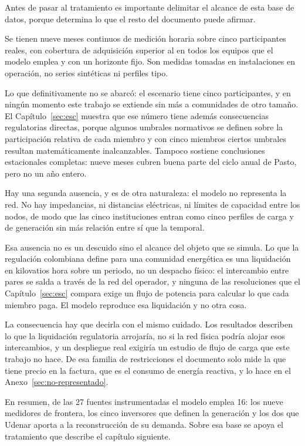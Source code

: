 Antes de pasar al tratamiento es importante delimitar el alcance de esta base de
datos, porque determina lo que el resto del documento puede afirmar.

Se tienen nueve meses continuos de medición horaria sobre cinco
participantes reales, con cobertura de adquisición superior al  en
todos los equipos que el modelo emplea y con un horizonte fijo. Son
medidas tomadas en instalaciones en operación, no series sintéticas ni
perfiles tipo.

Lo que definitivamente no se abarcó: el escenario tiene cinco
participantes, y en ningún momento este trabajo se extiende sin más a
comunidades de otro tamaño. El
Capítulo~\ref{sec:esc} muestra que ese número tiene además consecuencias
regulatorias directas, porque algunos umbrales normativos se definen sobre
la participación relativa de cada miembro y con cinco miembros ciertos
umbrales resultan matemáticamente inalcanzables. Tampoco sostiene conclusiones
estacionales completas: nueve meses cubren buena parte del ciclo anual de
Pasto, pero no un año entero.

Hay una segunda ausencia, y es de otra naturaleza: el modelo no representa
la red. No hay impedancias, ni distancias eléctricas, ni límites de
capacidad entre los nodos, de modo que las cinco instituciones entran como
cinco perfiles de carga y de generación sin más relación entre sí que la
temporal.

Esa ausencia no es un descuido sino el alcance del objeto que se simula.
Lo que la regulación colombiana define para una comunidad energética es
una liquidación en kilovatios hora sobre un periodo, no un despacho
físico: el intercambio entre pares se salda a través de la red del
operador, y ninguna de las resoluciones que el Capítulo~\ref{sec:esc}
compara exige un flujo de potencia para calcular lo que cada miembro paga.
El modelo reproduce esa liquidación y no otra cosa.

La consecuencia hay que decirla con el mismo cuidado. Los resultados
describen lo que la liquidación regulatoria arrojaría, no si la red física
podría alojar esos intercambios, y un despliegue real exigiría un estudio
de flujo de carga que este trabajo no hace. De esa familia de restricciones
el documento solo mide la que tiene precio en la factura, que es el consumo
de energía reactiva, y lo hace en el
Anexo~\ref{sec:no-representado}.

En resumen, de las 27 fuentes instrumentadas el modelo emplea 16: los
nueve medidores de frontera, los cinco inversores que definen la generación
y los dos que Udenar aporta a la reconstrucción de su demanda. Sobre esa
base se apoya el tratamiento que describe el capítulo siguiente.
